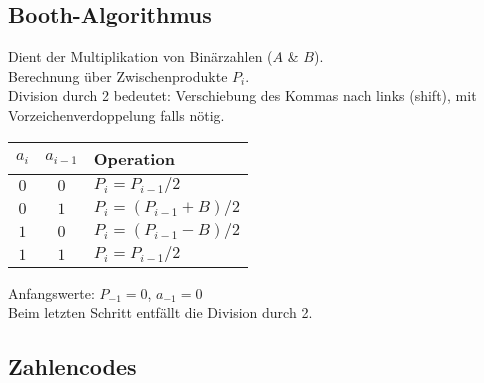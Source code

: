 \subsection{Booth-Algorithmus}
Dient der Multiplikation von Binärzahlen ($A$ \& $B$).\\
Berechnung über Zwischenprodukte $P_i$.\\
Division durch 2 bedeutet: Verschiebung des Kommas nach links (shift), mit Vorzeichenverdoppelung falls nötig.
\begin{center}
    \begin{tabular}{c c l}
        $a_i$ & $a_{i - 1}$ & Operation\\
        \hline
        $0$ & $0$ & $P_i = P_{i-1}/2$\\
        $0$ & $1$ & $P_i = (P_{i-1} + B)/2$\\
        $1$ & $0$ & $P_i = (P_{i-1} - B)/2$\\
        $1$ & $1$ & $P_i = P_{i-1}/2$\\
    \end{tabular}
\end{center}
Anfangswerte: $P_{-1} = 0$, $a_{-1} = 0$\\
Beim letzten Schritt entfällt die Division durch 2.

\subsection{Zahlencodes}
\begin{center}
\end{center}